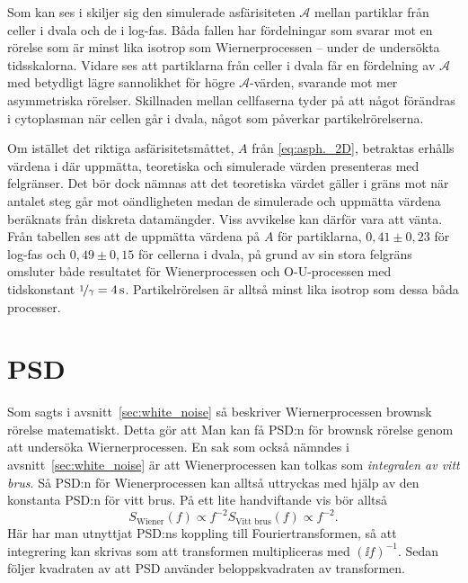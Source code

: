 Som kan ses i  skiljer sig den simulerade asfärisiteten $\mathcal{A}$ mellan partiklar från celler i dvala och de i log-fas. Båda fallen har fördelningar som svarar mot en rörelse som är minst lika isotrop som Wiernerprocessen -- under de undersökta tidsskalorna. Vidare ses att partiklarna från celler i dvala får en fördelning av $\mathcal{A}$ med betydligt lägre sannolikhet för högre $\mathcal{A}$-värden, svarande mot mer asymmetriska rörelser. Skillnaden mellan cellfaserna tyder på att något förändras i cytoplasman när cellen går i dvala, något som påverkar partikelrörelserna. 

Om istället det riktiga asfärisitetsmåttet, $A$ från \eqref{eq:asph._2D}, betraktas erhålls värdena i  där uppmätta, teoretiska och simulerade värden presenteras med felgränser. Det bör dock nämnas att det teoretiska värdet gäller i gräns mot när antalet steg går mot oändligheten medan de simulerade och uppmätta värdena beräknats från diskreta datamängder. Viss avvikelse kan därför vara att vänta. Från tabellen ses att de uppmätta värdena på $A$ för partiklarna, $0,41\pm0,23$ för log-fas och $0,49\pm0,15$ för cellerna i dvala, på grund av sin stora felgräns omsluter både resultatet för Wienerprocessen och O-U-processen med tidskonstant $\nicefrac{1}{\gamma}=\unit[4]{s}$. Partikelrörelsen är alltså minst lika isotrop som dessa båda processer.

\section{PSD}



Som sagts i avsnitt~\ref{sec:white_noise} så beskriver Wiernerprocessen brownsk rörelse matematiskt. Detta gör att Man kan få PSD:n för brownsk rörelse genom att undersöka Wiernerprocessen. En sak som också nämndes i avsnitt~\ref{sec:white_noise} är att Wienerprocessen kan tolkas som \emph{integralen av vitt brus}. Så PSD:n för Wienerprocessen kan alltså uttryckas med hjälp av den konstanta PSD:n för vitt brus.
På ett lite handviftande vis bör alltså 
\begin{equation}
S_\text{Wiener} (f) \propto f^{-2} S_\text{Vitt brus}(f) \propto f^{-2}.
\end{equation}
Här har man utnyttjat PSD:ns koppling till Fouriertransformen, så att integrering kan skrivas som att transformen multipliceras med $(\ii f)^{-1}$. Sedan följer kvadraten av att PSD använder beloppskvadraten av transformen. 

